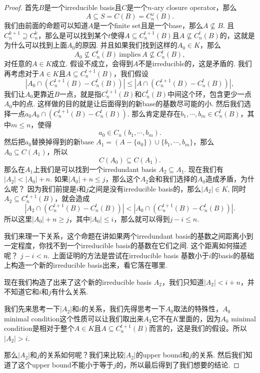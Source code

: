 \documentclass{article}
\begin{document}
\begin{proof}
首先$B$是一个irreducible basis且$C$是一个$n$-ary closure operator，那么
$$
A \subseteq S = C(B) = C_n^{\omega}(B).
$$
我们由前面的命题可以知道$A$是一个finite set且是一个base，那么$A \nsubseteq B$. 且$C_n^{k+1} \supseteq C_n^{k}$，那么是可以找到某个$t$使得$A \subseteq C_n^{t+1}(B)$且$A \nsubseteq C_n^{t}(B)$的，这就是为什么可以找到上面$A_0$的原因. 并且如果我们找到这样的$A_0 \in K$，那么
$$
A_0 \nsubseteq C_n^t(B)\ \text{implies} \ A \nsubseteq C_n^{t}(B),
$$
对任意的$A \in K$成立. 假设不成立，会得到$A$不是irreducible的，这是矛盾的. 我们再考虑对于$A \in K$且$A\subseteq C_n^{t+1}(B)$，我们假设
$$
|A_0 \cap (C_n^{t+1}(B) - C_n^{t}(B))| \leq |A \cap (C_n^{t+1}(B) - C_n^{t}(B))|,
$$
我们让$A_0$更靠近$B$一点，就是指$C_n^{t+1}(B)$和$C_n^t(B)$中间这个环，包含更少一点$A_0$中的点. 这样做的目的就是让后面得到的新base的基数尽可能的小. 然后我们选择一点$a_0 A_0 \cap (C_n^{t+1}(B) - C_n^{t}(B))$. 那么肯定是存在$b_1,\cdots,b_m \in C_n^t(B)$，其中$m \leq n$，使得
$$
a_0 \in C_n({b_1,\cdots,b_m}).
$$
然后把$a_0$替换掉得到的新base $A_1 = (A - \{a_0\}) \cup \{b_1,\cdots,b_m\}$，那么$A_0 \subseteq C(A_1)$，所以
$$
C(A_0) \subseteq C(A_1).
$$
那么在$A_1$上我们是可以找到一个irredundant basis $A_2 \subseteq A_1$. 现在我们有$|A_2| < |A_0| + n$. 如果$|A_0| + n \leq j$，那么这个$A_2$会和我们选择的$A_0$造成矛盾，为什么呢？ 因为我们前提是$i$和$j$之间是没有irreducible basis的，那么$|A_2| \in K$, 同时$A_2 \subseteq C_n^{t+1}(B)$，就会造成
$$
|A_2 \cap (C_n^{t+1}(B) - C_n^{t}(B))| < |A_0 \cap (C_n^{t+1}(B) - C_n^{t}(B))|.
$$
所以这里$|A_0| + n \geq j$，其中$|A_0| \leq i$，那么就可以得到$j - i \leq n$.

我们来理一下关系，这个命题在讲如果两个irredundant basis的基数之间距离小到一定程度，你找不到一个irreducible basis的基数在它们之间. 这个距离如何描述呢？ $j-i < n$. 上面证明的方法是尝试在irreducible basis 基数小于$i$的basis的基础上构造一个新的irreducible basis出来，看它落在哪里. 

现在我们构造了出来了这个新的irreducible basis $A_2$，我们只知道$|A_2| < i + n$，并不知道它和$i$和$j$有什么关系. 

我们先来思考一下$|A_2|$和$i$的关系，我们先得思考一下$A_0$取法的特殊性，$A_0$ minimal condition这个性质可以让我们取出来$A_2$它不在$K$里面的，因为$A_0$ minimal condition是相对于整个$A \in K$且$A \subseteq C_n^{t+1}(B)$而言的，这是我们的假设。所以$|A_2| > i$.

那么$|A_2|$和$j$的关系如何呢？我们来比较$|A_2|$的upper bound和$j$的关系. 然后我们知道了这个upper bound不能小于等于$j$的，所以最后得到了我们想要的结论.
\end{proof}
\end{document}
